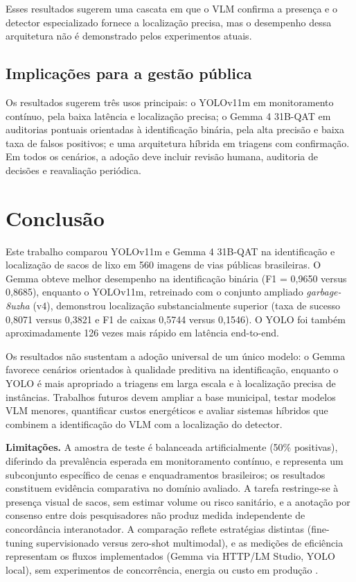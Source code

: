 \documentclass[kdmile,a4paper]{kdmile}
\begin{document}
Esses resultados sugerem uma cascata em que o VLM confirma a presença e o detector especializado fornece a localização precisa, mas o desempenho dessa arquitetura não é demonstrado pelos experimentos atuais.

\subsection{Implicações para a gestão pública}
\label{sec:implicacoes-gestao}

Os resultados sugerem três usos principais: o YOLOv11m em monitoramento contínuo, pela baixa latência e localização precisa; o Gemma 4 31B-QAT em auditorias pontuais orientadas à identificação binária, pela alta precisão e baixa taxa de falsos positivos; e uma arquitetura híbrida em triagens com confirmação. Em todos os cenários, a adoção deve incluir revisão humana, auditoria de decisões e reavaliação periódica.

\section{Conclusão}
\label{sec:conclusao}

Este trabalho comparou YOLOv11m e Gemma 4 31B-QAT na identificação e localização de sacos de lixo em 560 imagens de vias públicas brasileiras. O Gemma obteve melhor desempenho na identificação binária (F1 = 0,9650 versus 0,8685), enquanto o YOLOv11m, retreinado com o conjunto ampliado \emph{garbage-8uzha} (v4), demonstrou localização substancialmente superior (taxa de sucesso 0,8071 versus 0,3821 e F1 de caixas 0,5744 versus 0,1546). O YOLO foi também aproximadamente 126 vezes mais rápido em latência end-to-end.

Os resultados não sustentam a adoção universal de um único modelo: o Gemma favorece cenários orientados à qualidade preditiva na identificação, enquanto o YOLO é mais apropriado a triagens em larga escala e à localização precisa de instâncias. Trabalhos futuros devem ampliar a base municipal, testar modelos VLM menores, quantificar custos energéticos e avaliar sistemas híbridos que combinem a identificação do VLM com a localização do detector.

\noindent\textbf{Limitações.} A amostra de teste é balanceada artificialmente (50\% positivas), diferindo da prevalência esperada em monitoramento contínuo, e representa um subconjunto específico de cenas e enquadramentos brasileiros; os resultados constituem evidência comparativa no domínio avaliado. A tarefa restringe-se à presença visual de sacos, sem estimar volume ou risco sanitário, e a anotação por consenso entre dois pesquisadores não produz medida independente de concordância interanotador. A comparação reflete estratégias distintas (fine-tuning supervisionado versus zero-shot multimodal), e as medições de eficiência representam os fluxos implementados (Gemma via HTTP/LM Studio, YOLO local), sem experimentos de concorrência, energia ou custo em produção \cite{Madan2024FewShotVLM}.
\end{document}
